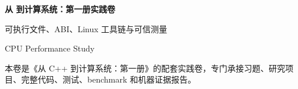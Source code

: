 \begin{titlepage}
\thispagestyle{empty}
\vspace*{2.2cm}
{\Huge\bfseries\color{BookNavy} 从 \cpp 到计算系统：第一册实践卷\par}
\vspace{0.68cm}
{\Large\color{BookAccent} 可执行文件、ABI、Linux 工具链与可信测量\par}
\vspace{1.25cm}
{\large CPU Performance Study\par}
\vfill
{\small\color{BookMuted} 本卷是《从 C++ 到计算系统：第一册》的配套实践卷，专门承接习题、研究项目、完整代码、测试、benchmark 和机器证据报告。\par}
\end{titlepage}
